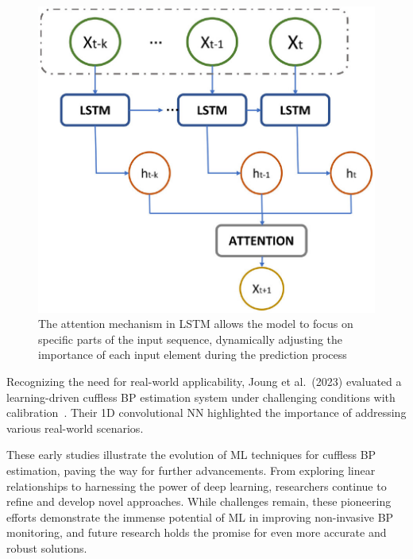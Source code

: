 \begin{figure}
  \begin{minipage}[c]{0.5\textwidth}
    \includegraphics[width=\textwidth]{images/ml/attention}
  \end{minipage}\hfill
  \begin{minipage}[c]{0.5\textwidth}
    \caption{The attention mechanism in LSTM allows the model to focus on specific parts of the input sequence, dynamically adjusting the importance of each input element during the prediction process~\cite{marulandaHybridModelBased2023}}
    \label{fig:attention}
  \end{minipage}
\end{figure}


Recognizing the need for real-world applicability, Joung et al.\ (2023) evaluated a learning-driven cuffless BP estimation system under challenging conditions with calibration~\cite{joungContinuousCufflessBlood2023}.
Their 1D convolutional NN highlighted the importance of addressing various real-world scenarios.

These early studies illustrate the evolution of ML techniques for cuffless BP estimation, paving the way for further advancements.
From exploring linear relationships to harnessing the power of deep learning, researchers continue to refine and develop novel approaches.
While challenges remain, these pioneering efforts demonstrate the immense potential of ML in improving non-invasive BP monitoring, and future research holds the promise for even more accurate and robust solutions.

